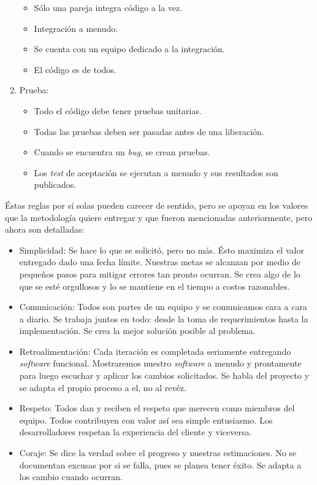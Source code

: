 \begin{enumerate}
\begin{itemize}
	\item Sólo una pareja integra código a la vez.
	\item Integración a menudo.
	\item Se cuenta con un equipo dedicado a la integración.
	\item El código es de todos.
	\end{itemize}
\item Prueba:
	\begin{itemize}
	\item Todo el código debe tener pruebas unitarias.
	\item Todas las pruebas deben ser pasadas antes de una liberación.
	\item Cuando se encuentra un \textit{bug}, se crean pruebas.
	\item Los \textit{test} de aceptación se ejecutan a menudo y sus resultados son publicados.
	\end{itemize}
\end{enumerate}

Éstas reglas por sí solas pueden carecer de sentido, pero se apoyan en los valores que la metodología quiere entregar y que fueron mencionadas anteriormente, pero ahora son detalladas:

\begin{itemize}
\item Simplicidad: Se hace lo que se solicitó, pero no más. Ésto maximiza el valor entregado dado una fecha límite. Nuestras metas se alcanzan por medio de pequeños pasos para mitigar errores tan pronto ocurran. Se crea algo de lo que se esté orgullosos y lo se mantiene en el tiempo a costos razonables.
\item Comunicación: Todos son partes de un equipo y se comunicamos cara a cara a diario. Se trabaja juntos en todo: desde la toma de requerimientos hasta la implementación. Se crea la mejor solución posible al problema.
\item Retroalimentación: Cada iteración es completada seriamente entregando \textit{software} funcional. Mostraremos nuestro \textit{software} a menudo y prontamente para luego escuchar y aplicar los cambios solicitados. Se habla del proyecto y se adapta el propio proceso a el, no al revéz.
\item Respeto: Todos dan y reciben el respeto que merecen como miembros del equipo. Todos contribuyen con valor así sea simple entusiasmo. Los desarrolladores respetan la experiencia del cliente y viceversa. 
\item Coraje: Se dice la verdad sobre el progreso y nuestras estimaciones. No se documentan excusas por si se falla, pues se planea tener éxito. Se adapta a los cambio cuando ocurran.
\end{itemize}

